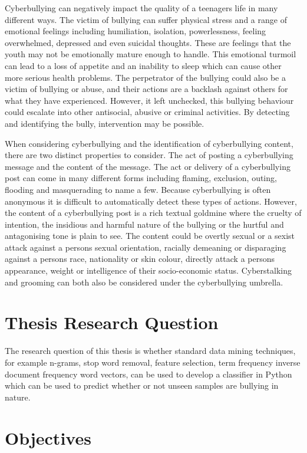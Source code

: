 Cyberbullying can negatively impact the quality of a teenagers life in many different ways. The victim of bullying can suffer physical stress and a range of emotional feelings including humiliation, isolation, powerlessness, feeling overwhelmed, depressed and even suicidal thoughts. These are feelings that the youth may not be emotionally mature enough to handle. This emotional turmoil can lead to a loss of appetite and an inability to sleep which can cause other more serious health problems. The perpetrator of the bullying could also be a victim of bullying or abuse, and their actions are a backlash against others for what they have experienced. However, it left unchecked, this bullying behaviour could escalate into other antisocial, abusive or criminal activities. By detecting and identifying the bully, intervention may be possible.

When considering cyberbullying and the identification of cyberbullying content, there are two distinct properties to consider. The act of posting a cyberbullying message and the content of the message. The act or delivery of a cyberbullying post can come in many different forms including flaming, exclusion, outing, flooding and masquerading to name a few. Because cyberbullying is often anonymous it is difficult to automatically detect these types of actions. However, the content of a cyberbullying post is a rich textual goldmine where the cruelty of intention, the insidious and harmful nature of the bullying or the hurtful and antagonising tone is plain to see. The content could be overtly sexual or a sexist attack against a persons sexual orientation, racially demeaning or disparaging against a persons race, nationality or skin colour, directly attack a persons appearance, weight or intelligence of their socio-economic status. Cyberstalking and grooming can both also be considered under the cyberbullying umbrella.

\section{Thesis Research Question}

The research question of this thesis is whether standard data mining techniques, for example n-grams, stop word removal, feature selection, term frequency inverse document frequency word vectors, can be used to develop a classifier in Python which can be used to predict whether or not unseen samples are bullying in nature.


\section{Objectives}


